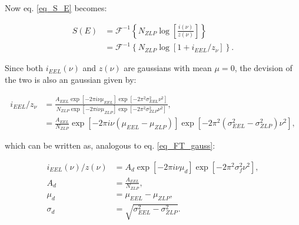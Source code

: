 Now eq. \eqref{eq_S_E} becomes:

\begin{equation}\label{eq_S_gauss}
\begin{aligned}
S(E) &= \mathcal{F}^{-1}\left\{N_{ZLP}\operatorname{log}\left[\frac{i(\nu)}{z(\nu)}\right]\right\} \\
&= \mathcal{F}^{-1}\left\{N_{ZLP}\operatorname{log}\left[1+ i_{EEL}/z_{\nu}\right]\right\}.
\end{aligned}
\end{equation}

Since both $i_{EEL}(\nu)$ and $z(\nu)$ are gaussians with mean $\mu = 0$, the devision of the two is also an gaussian given by:

\begin{equation}
\begin{aligned}
i_{EEL}/z_{\nu} &= \frac{A_{EEL} \exp{\left[-2 \pi i \nu \mu_{EEL}\right]} \exp{\left[-2 \pi^{2} \sigma_{EEL}^{2} \nu^{2}\right]}}{N_{ZLP} \exp{\left[-2 \pi i \nu \mu_{ZLP}\right]} \exp{\left[-2 \pi^{2} \sigma_{ZLP}^{2} \nu^{2}\right]}} ,\\
&= \frac{A_{EEL}}{N_{ZLP}} \exp{\left[-2 \pi i \nu (\mu_{EEL} - \mu_{ZLP})\right]} \exp{\left[-2 \pi^{2} (\sigma_{EEL}^{2} - \sigma_{ZLP}^{2}) \nu^{2}\right]},
\end{aligned}
\end{equation}

which can be written as, analogous to eq. \eqref{eq_FT_gauss}:



\begin{equation}\label{eq_gauss_conv2}
\begin{aligned}
i_{EEL}(\nu)/z(\nu) &= A_d \exp{[-2\pi i \nu \mu_d]} \exp{\left[ -2\pi^2 \sigma_f^2 \nu^2 \right]},\\
A_d &= \frac{A_{EEL}}{N_{ZLP}},\\
\mu_d &= \mu_{EEL} - \mu_{ZLP},\\
\sigma_d &= \sqrt{\sigma_{EEL}^2 - \sigma_{ZLP}^2}.
\end{aligned}
\end{equation}






